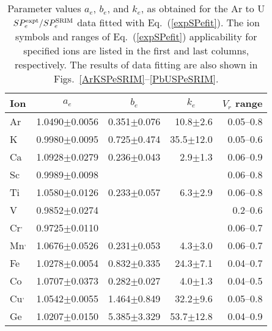 \documentclass[aps,pra,twocolumn,amsmath,amssymb,floatfix]{revtex4-2}
\begin{document}
\begin{table}[!h]  %
\caption{\label{abkeparam} Parameter values $a_{e}$, $b_{e}$, and $k_{e}$, as obtained for the Ar to U $SP_{e}^{\rm expt}/SP_{e}^{\rm SRIM}$ data fitted with Eq.~(\ref{expSPefit}). The ion symbols and ranges of Eq.~(\ref{expSPefit}) applicability for specified ions are listed in the first and last columns, respectively. The results of data fitting are also
shown in Figs.~\ref{ArKSPeSRIM}--\ref{PbUSPeSRIM}.
}
\begin{ruledtabular}
\begin{tabular}{lccrr}
Ion                                   &                    $a_{e}$       &                $b_{e}$       & \multicolumn{1}{c}{$k_{e}$} &$V_{r}$ range \\
\hline
  Ar\footnotemark[1] & 1.0490$\pm$0.0056 & 0.351$\pm$0.076      & 10.8$\pm$2.6   &  0.05--0.8    \\
   K\footnotemark[2]  & 0.9980$\pm$0.0095 & 0.725$\pm$0.474      & 35.5$\pm$12.0 &  0.05--0.6    \\
  Ca\footnotemark[3] & 1.0928$\pm$0.0279 & 0.236$\pm$0.043      &   2.9$\pm$1.3    &   0.06--0.9   \\
  Sc\footnotemark[2]  & 0.9989$\pm$0.0098 &                                          &                                 &   0.06--0.8   \\
  Ti                                    & 1.0580$\pm$0.0126  & 0.233$\pm$0.057      &   6.3$\pm$2.9    &  0.06--0.8    \\
  V                                     & 0.9852$\pm$0.0274  &                                          &                                 &    0.2--0.6    \\
  Cr\footnotemark[2]$^{,}$\footnotemark[4]  & 0.9725$\pm$0.0110 &                                           &                                 &    0.06--0.7  \\
 Mn\footnotemark[2]$^{,}$\footnotemark[4] & 1.0676$\pm$0.0526 & 0.231$\pm$0.053      &   4.3$\pm$3.0     &    0.06--0.7  \\
  Fe\footnotemark[4]  & 1.0278$\pm$0.0054 & 0.832$\pm$0.335      & 24.3$\pm$7.1     &   0.04--0.7  \\
  Co\footnotemark[4]  & 1.0707$\pm$0.0373 & 0.282$\pm$0.027     &    4.0$\pm$1.3     &   0.04--0.5  \\
  Cu\footnotemark[2]$^{,}$\footnotemark[4]  & 1.0542$\pm$0.0055 & 1.464$\pm$0.849     & 32.2$\pm$9.6      &   0.05--0.8  \\
  Ge                                    & 1.0207$\pm$0.0150 & 5.385$\pm$3.329     & 53.7$\pm$12.8   &   0.04--0.9  \\

\end{tabular}
\end{ruledtabular}
\end{table}
\end{document}
